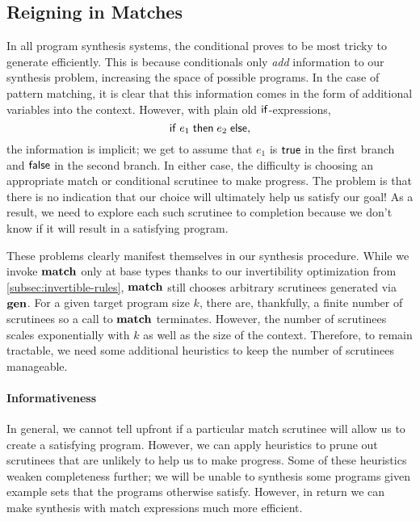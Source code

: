 \subsection{Reigning in Matches}
\label{subsec:reigning-in-matches}

In all program synthesis systems, the conditional proves to be most tricky to generate efficiently.
This is because conditionals only \emph{add} information to our synthesis problem, increasing the space of possible programs.
In the case of pattern matching, it is clear that this information comes in the form of additional variables into the context.
However, with plain old $\mathsf{if}$-expressions,
\[
  \mathsf{if}\;e_1\;\mathsf{then}\;e_2\;\mathsf{else},
\]
the information is implicit; we get to assume that $e_1$ is $\mathsf{true}$ in the first branch and $\mathsf{false}$ in the second branch.
In either case, the difficulty is choosing an appropriate match or conditional scrutinee to make progress.
The problem is that there is no indication that our choice will ultimately help us satisfy our goal!
As a result, we need to explore each such scrutinee to completion because we don't know if it will result in a satisfying program.

These problems clearly manifest themselves in our synthesis procedure.
While we invoke $\mathbf{match}$ only at base types thanks to our invertibility optimization from \autoref{subsec:invertible-rules}, $\mathbf{match}$ still chooses arbitrary scrutinees generated via $\mathbf{gen}$.
For a given target program size $k$, there are, thankfully, a finite number of scrutinees so a call to $\mathbf{match}$ terminates.
However, the number of scrutinees scales exponentially with $k$ as well as the size of the context.
Therefore, to remain tractable, we need some additional heuristics to keep the number of scrutinees manageable.

\paragraph{Informativeness}
In general, we cannot tell upfront if a particular match scrutinee will allow us to create a satisfying program.
However, we can apply heuristics to prune out scrutinees that are unlikely to help us to make progress.
Some of these heuristics weaken completeness further; we will be unable to synthesis some programs given example sets that the programs otherwise satisfy.
However, in return we can make synthesis with match expressions much more efficient.


